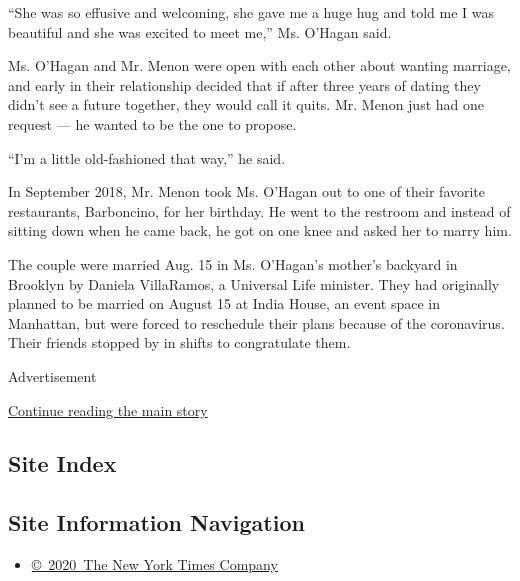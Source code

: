 ``She was so effusive and welcoming, she gave me a huge hug and told me
I was beautiful and she was excited to meet me,'' Ms. O'Hagan said.

Ms. O'Hagan and Mr. Menon were open with each other about wanting
marriage, and early in their relationship decided that if after three
years of dating they didn't see a future together, they would call it
quits. Mr. Menon just had one request --- he wanted to be the one to
propose.

``I'm a little old-fashioned that way,'' he said.

In September 2018, Mr. Menon took Ms. O'Hagan out to one of their
favorite restaurants, Barboncino, for her birthday. He went to the
restroom and instead of sitting down when he came back, he got on one
knee and asked her to marry him.

The couple were married Aug. 15 in Ms. O'Hagan's mother's backyard in
Brooklyn by Daniela VillaRamos, a Universal Life minister. They had
originally planned to be married on August 15 at India House, an event
space in Manhattan, but were forced to reschedule their plans because of
the coronavirus. Their friends stopped by in shifts to congratulate
them.

Advertisement

\protect\hyperlink{after-bottom}{Continue reading the main story}

\hypertarget{site-index}{%
\subsection{Site Index}\label{site-index}}

\hypertarget{site-information-navigation}{%
\subsection{Site Information
Navigation}\label{site-information-navigation}}

\begin{itemize}
\tightlist
\item
  \href{https://help.nytimes3xbfgragh.onion/hc/en-us/articles/115014792127-Copyright-notice}{©~2020~The
  New York Times Company}
\end{itemize}

